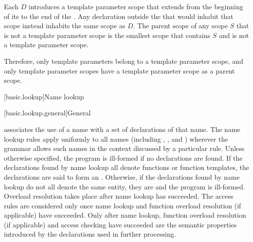 \pnum
Each  $D$ introduces
a template parameter scope
that extends from the beginning of its 
to the end of the .
Any declaration outside the 
that would inhabit that scope instead inhabits the same scope as $D$.
The parent scope of any scope $S$ that is not a template parameter scope
is the smallest scope that contains $S$ and is not a template parameter scope.
\begin{note}
Therefore, only template parameters belong to a template parameter scope, and
only template parameter scopes have
a template parameter scope as a parent scope.
\end{note}


[basic.lookup]{Name lookup}%


[basic.lookup.general]{General}%
%

\pnum
{} associates the use of a name
with a set of declarations of that name.
The name lookup rules apply uniformly to all names (including
,
, and
) wherever the grammar allows
such names in the context discussed by a particular rule.
Unless otherwise specified,
the program is ill-formed if no declarations are found.
If the declarations found by name lookup
all denote functions or function templates,
the declarations are said to form an .
Otherwise,
if the declarations found by name lookup do not all denote the same entity,
%
they are  and the program is ill-formed.
Overload resolution
takes place after name lookup has succeeded. The access rules
are considered only once name lookup and
function overload resolution (if applicable) have succeeded. Only after
name lookup, function overload resolution (if applicable) and access
checking have succeeded
are the semantic properties introduced by the declarations
used in further processing.

